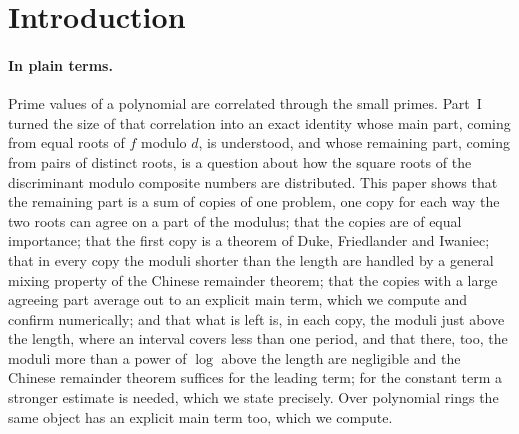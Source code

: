\documentclass[11pt,a4paper]{article}
\theoremstyle{remark}\newtheorem{remark}[theorem]{Remark}
\newcommand{\Off}{\mathrm{Off}}\newcommand{\e}{\mathrm{e}}
\begin{document}
\begin{abstract}
(Hypothesis~W, a bound $(uk)^Bt^{\theta}$ for the Weyl sums of the dilated roots at frequency $k$ over moduli up to $t$)
gives it when $B<(1-\theta)/(2-\theta)$, so that any power saving in the modulus suffices provided the loss in the frequency and the
dilation is a small enough power, and prove the Ces\`aro form of Conjecture~1, constant included, under that hypothesis. Over $\F_q[u]$ we prove that the off-diagonal has a main term:
for $f=t^2-u$ and the two smallest lengths, $\Off_f(N)=-2/q+O(q^{-3/2})$; a configuration count predicts, and
exact computations for three discriminants and $q\le43$ confirm, that the generic value is $-1/q$, the weight of
the excluded diagonal pairs at the first degree above the cut-off, the value $-2/q$ being a small-length effect.
\end{abstract}

\section{Introduction}\label{sec:intro}

\paragraph{In plain terms.} Prime values of a polynomial are correlated through the small primes. Part~I
turned the size of that correlation into an exact identity whose main part, coming from equal roots of $f$
modulo $d$, is understood, and whose remaining part, coming from pairs of distinct roots, is a question about
how the square roots of the discriminant modulo composite numbers are distributed. This paper shows that
the remaining part is a sum of copies of one problem, one copy for each way the two roots can agree on a part
of the modulus; that the copies are of equal importance; that the first copy is a theorem of Duke, Friedlander
and Iwaniec; that in every copy the moduli shorter than the length are handled by a general mixing property
of the Chinese remainder theorem; that the copies with a large agreeing part average out to an explicit main
term, which we compute and confirm numerically; and that what is left is, in each copy, the moduli just above
the length, where an interval covers less than one period, and that there, too, the moduli more than a power of $\log$ above the length are negligible and the Chinese remainder
theorem suffices for the leading term; for the constant term a stronger estimate is needed, which we state precisely. Over polynomial rings the same object has an
explicit main term too, which we compute.
\end{document}

